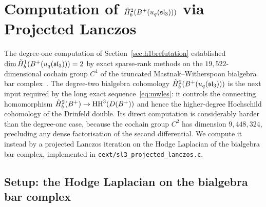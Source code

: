 %
%
%

\section{Computation of $\tilde{H}^2_b(B^{+}(u_q(\mathfrak{sl}_3)))$ via Projected Lanczos}
\label{sec:h2b_lanczos}

The degree-one computation of Section~\ref{sec:h1brefutation} established $\dim \tilde{H}^1_b(B^{+}(u_q(\mathfrak{sl}_3))) = 2$ by exact sparse-rank methods on the $19{,}522$-dimensional cochain group $C^1$ of the truncated Mastnak--Witherspoon bialgebra bar complex~\cite{MW08}. The degree-two bialgebra cohomology $\tilde{H}^2_b(B^{+}(u_q(\mathfrak{sl}_3)))$ is the next input required by the long exact sequence~\eqref{eq:mwles}: it controls the connecting homomorphism $\tilde{H}^2_b(B^{+}) \to \operatorname{HH}^3(D(B^{+}))$ and hence the higher-degree Hochschild cohomology of the Drinfeld double. Its direct computation is considerably harder than the degree-one case, because the cochain group $C^2$ has dimension $9{,}448{,}324$, precluding any dense factorisation of the second differential. We compute it instead by a projected Lanczos iteration on the Hodge Laplacian of the bialgebra bar complex, implemented in \texttt{cext/sl3\_projected\_lanczos.c}.

\subsection{Setup: the Hodge Laplacian on the bialgebra bar complex}
\label{sec:h2b_setup}

